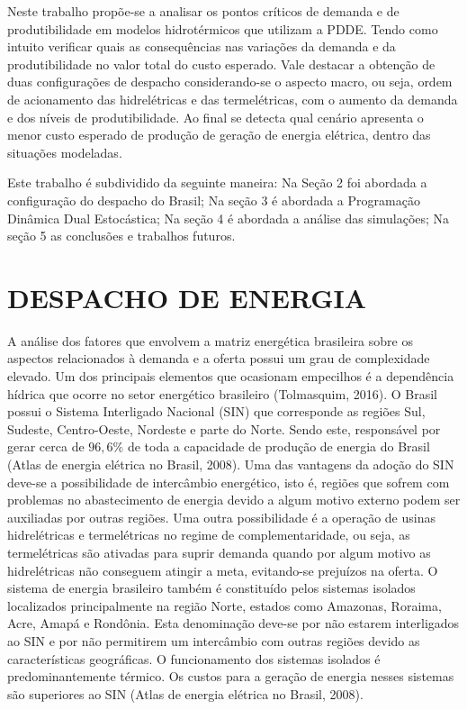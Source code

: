 \documentclass[12pt,fleqn]{article}
\begin{document}
Neste trabalho propõe-se a analisar os pontos cr\'iticos de demanda e de produtibilidade em modelos hidrot\'ermicos que utilizam a PDDE.
Tendo como intuito verificar quais as consequ\^encias nas varia\c c\~oes da demanda e da produtibilidade no valor total do custo esperado. Vale destacar a obten\c c\~ao de duas configura\c c\~oes de despacho considerando-se o aspecto macro, ou seja, ordem de acionamento das hidrel\'etricas e das termel\'etricas, com o aumento da demanda e dos n\'iveis de produtibilidade.  Ao final se detecta qual cen\'ario apresenta o menor custo esperado de produ\c c\~ao de gera\c c\~ao de energia el\'etrica, dentro das situa\c c\~oes modeladas.

 Este trabalho \'e
subdividido da seguinte maneira: Na Se\c c\~ao 2 foi abordada a configura\c c\~ao do despacho do Brasil; Na se\c c\~ao 3
\'e abordada a Programa\c c\~ao Din\^amica Dual Estoc\'astica; Na se\c c\~ao 4 \'e abordada a an\'alise das simula\c
c\~oes; Na se\c c\~ao 5 as conclus\~oes e trabalhos futuros. 

\section{DESPACHO DE ENERGIA}
A an\'alise dos fatores que envolvem a matriz energ\'etica brasileira sobre os aspectos relacionados \`a demanda e a oferta possui um grau de complexidade elevado. Um dos principais elementos que ocasionam empecilhos \'e a depend\^encia h\'idrica que ocorre no setor energ\'etico brasileiro (Tolmasquim, 2016). O Brasil possui o Sistema Interligado Nacional (SIN) que corresponde as
regi\~oes Sul, Sudeste, Centro-Oeste, Nordeste e parte do Norte. Sendo este, respons\'avel por gerar cerca de $96,6\%$ de toda a capacidade de produ\c c\~ao de energia do Brasil (Atlas de
energia el\'etrica no Brasil, 2008). Uma das vantagens da ado\c c\~ao do SIN deve-se a possibilidade de interc\^ambio
energ\'etico, isto \'e, regi\~oes que sofrem com problemas no abastecimento  de energia devido a algum motivo externo
podem ser auxiliadas por outras regi\~oes. Uma outra possibilidade \'e a opera\c c\~ao de usinas hidrel\'etricas e termel\'etricas no
regime de complementaridade, ou seja, as termel\'etricas s\~ao ativadas para suprir demanda quando por algum motivo as
hidrel\'etricas n\~ao conseguem atingir a meta, evitando-se preju\'izos na oferta. O sistema de energia brasileiro tamb\'em \'e constitu\'ido pelos sistemas isolados localizados principalmente na regi\~ao Norte,
estados como Amazonas, Roraima, Acre, Amap\'a e Rond\^onia. Esta denomina\c c\~ao deve-se por n\~ao estarem interligados ao
SIN e por n\~ao permitirem um interc\^ambio com outras regi\~oes devido as caracter\'isticas geogr\'aficas. O
funcionamento dos
sistemas isolados \'e predominantemente t\'ermico. Os custos para a gera\c c\~ao de energia nesses sistemas s\~ao
superiores ao SIN (Atlas de
energia el\'etrica no Brasil, 2008).
\end{document}
